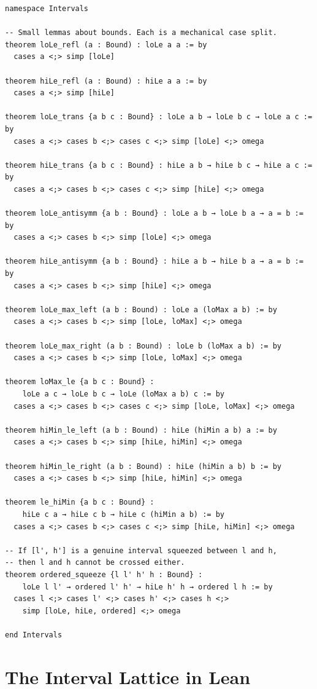\documentclass[12pt, a4paper, openright]{book}
\theoremstyle{thmstyle}
\theoremstyle{defstyle}
\begin{document}
\begin{verbatim}
namespace Intervals

-- Small lemmas about bounds. Each is a mechanical case split.
theorem loLe_refl (a : Bound) : loLe a a := by
  cases a <;> simp [loLe]

theorem hiLe_refl (a : Bound) : hiLe a a := by
  cases a <;> simp [hiLe]

theorem loLe_trans {a b c : Bound} : loLe a b → loLe b c → loLe a c := by
  cases a <;> cases b <;> cases c <;> simp [loLe] <;> omega

theorem hiLe_trans {a b c : Bound} : hiLe a b → hiLe b c → hiLe a c := by
  cases a <;> cases b <;> cases c <;> simp [hiLe] <;> omega

theorem loLe_antisymm {a b : Bound} : loLe a b → loLe b a → a = b := by
  cases a <;> cases b <;> simp [loLe] <;> omega

theorem hiLe_antisymm {a b : Bound} : hiLe a b → hiLe b a → a = b := by
  cases a <;> cases b <;> simp [hiLe] <;> omega

theorem loLe_max_left (a b : Bound) : loLe a (loMax a b) := by
  cases a <;> cases b <;> simp [loLe, loMax] <;> omega

theorem loLe_max_right (a b : Bound) : loLe b (loMax a b) := by
  cases a <;> cases b <;> simp [loLe, loMax] <;> omega

theorem loMax_le {a b c : Bound} :
    loLe a c → loLe b c → loLe (loMax a b) c := by
  cases a <;> cases b <;> cases c <;> simp [loLe, loMax] <;> omega

theorem hiMin_le_left (a b : Bound) : hiLe (hiMin a b) a := by
  cases a <;> cases b <;> simp [hiLe, hiMin] <;> omega

theorem hiMin_le_right (a b : Bound) : hiLe (hiMin a b) b := by
  cases a <;> cases b <;> simp [hiLe, hiMin] <;> omega

theorem le_hiMin {a b c : Bound} :
    hiLe c a → hiLe c b → hiLe c (hiMin a b) := by
  cases a <;> cases b <;> cases c <;> simp [hiLe, hiMin] <;> omega

-- If [l', h'] is a genuine interval squeezed between l and h,
-- then l and h cannot be crossed either.
theorem ordered_squeeze {l l' h' h : Bound} :
    loLe l l' → ordered l' h' → hiLe h' h → ordered l h := by
  cases l <;> cases l' <;> cases h' <;> cases h <;>
    simp [loLe, hiLe, ordered] <;> omega

end Intervals
\end{verbatim}

\section{The Interval Lattice in Lean}
\end{document}
